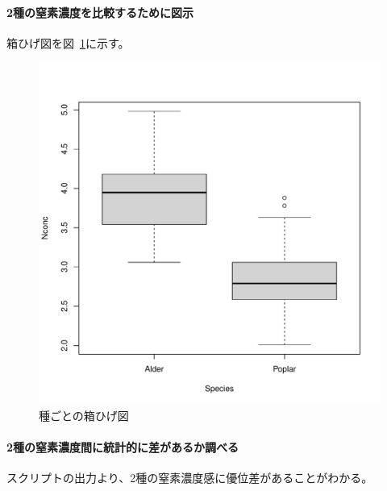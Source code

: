 \documentclass{jsarticle}
\begin{document}
\paragraph{2種の窒素濃度を比較するために図示}
    箱ひげ図を図~\ref{fig:box}に示す。
    \begin{figure}
        \centering
        \includegraphics[width=0.6\hsize]{box-chart.pdf}
        \caption{種ごとの箱ひげ図}
        \label{fig:box}
    \end{figure}

\paragraph{2種の窒素濃度間に統計的に差があるか調べる}
    スクリプトの出力より、2種の窒素濃度感に優位差があることがわかる。
\end{document}
